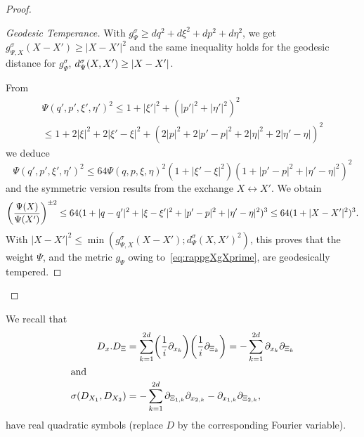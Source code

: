 \documentclass[10pt]{amsart}
\theoremstyle{definition}\newtheorem{defi}[theo]{Definition}\newtheorem{rema}[theo]{Remark}\newtheorem{exam}[theo]{Example}\newtheorem{exem}[theo]{Example}\newtheorem{nota}[theo]{Notation}
\let\originalleft\left
\let\originalright\right
\renewcommand{\left}{\mathopen{}\mathclose\bgroup\originalleft}
\renewcommand{\right}{\aftergroup\egroup\originalright}
\begin{document}
\begin{proof}
\begin{proof}[{Geodesic Temperance}]
With $g^{\sigma}_{\Psi}\geq dq^{2}+d\xi^{2}+dp^{2}+d\eta^{2}$, we get $g^{\sigma}_{\Psi,X}(X-X')\geq |X-X'|^{2}$ and the same inequality holds for the geodesic distance for $g_{\Psi}^{\sigma}$, $d^{\sigma}_{\Psi}(X,X')\geq \left|X-X'\right|$.

From
\begin{multline*}
\Psi(q',p',\xi',\eta')^{2}\leq 1+|\xi'|^{2}+(|p'|^{2}+|\eta'|^{2})^{2}\\
\leq 1+2|\xi|^{2}+2|\xi'-\xi|^{2}+(2|p|^{2}+2|p'-p|^{2}+2|\eta|^{2}+2|\eta'-\eta|)^{2}
\end{multline*}
we deduce
\[
\Psi(q',p',\xi',\eta')^{2}\leq 64 \Psi(q,p,\xi,\eta)^{2}(1+|\xi'-\xi|^{2})(1+|p'-p|^{2}+|\eta'-\eta|^{2})^{2}
\]
and the symmetric version results from the exchange $X\leftrightarrow X'$. We obtain
\[
\left(\frac{\Psi(X)}{\Psi(X')}\right)^{\pm 2}\leq 64 (1+|q-q'|^{2}+|\xi-\xi'|^{2}+|p'-p|^{2}+|\eta'-\eta|^{2})^{3}\leq 64(1+|X-X'|^{2})^{3}.
\]
With $|X-X'|^{2}\leq \min (g_{\Psi,X}^{\sigma}(X-X'); d_{\Psi}^{\sigma}(X,X')^{2})$, this proves that the weight $\Psi$, and the metric $g_{\Psi}$ owing to~\eqref{eq:rappgXgXprime}, are geodesically tempered.
\end{proof}
\let\qed\relax
\end{proof}

We recall that
\begin{align*}
D_{x}.D_{\Xi}&=\sum_{k=1}^{2d}\left(\frac{1}{i}\partial_{x_{k}}\right)\left(\frac{1}{i}\partial_{\Xi_{k}}\right)=-\sum_{k=1}^{2d}\partial_{x_{k}}\partial_{\Xi_{k}}\\
\intertext{and}
\sigma(D_{X_{1}},D_{X_{2}}) &=-\sum_{k=1}^{2d}\partial_{\Xi_{1,k}}\partial_{x_{2,k}}-\partial_{x_{1,k}}\partial_{\Xi_{2,k}},
\end{align*}
have real quadratic symbols (replace $D$ by the corresponding Fourier variable).
\end{document}
